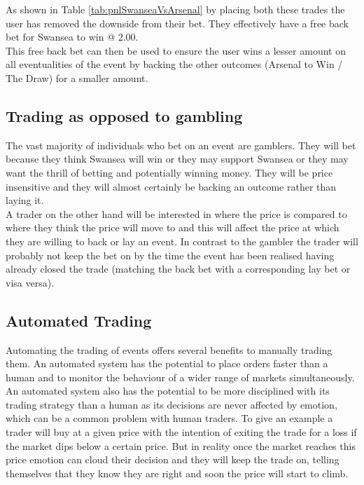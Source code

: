 			As shown in Table \ref{tab:pnlSwanseaVsArsenal} by placing both these trades the user has removed the downside from their bet. They effectively have a free back bet for Swansea to win @ 2.00. \\
			
			This free back bet can then be used to ensure the user wins a lesser amount on all eventualities of the event by backing the other outcomes (Arsenal to Win / The Draw) for a smaller amount.
			
		\subsection{Trading as opposed to gambling}
			
			The vast majority of individuals who bet on an event are gamblers. They will bet because they think Swansea will win or they may support Swansea or they may want the thrill of betting and potentially winning money. They will be price insensitive and they will almost certainly be backing an outcome rather than laying it.\\
			
			 A trader on the other hand will be interested in where the price is compared to where they think the price will move to and this will affect the price at which they are willing to back or lay an event. In contrast to the gambler the trader will probably not keep the bet on by the time the event has been realised having already closed the trade (matching the back bet with a corresponding lay bet or visa versa).
		
		\subsection{Automated Trading}
		
			Automating the trading of events offers several benefits to manually trading them. An automated system has the potential to place orders faster than a human and to monitor the behaviour of a wider range of markets simultaneously.\\
			
			An automated system also has the potential to be more disciplined with its trading strategy than a human as its decisions are never affected by emotion, which can be a common problem with human traders. To give an example a trader will buy at a given price with the intention of exiting the trade for a loss if the market dips below a certain price. But in reality once the market reaches this price emotion can cloud their decision and they will keep the trade on, telling themselves that they know they are right and soon the price will start to climb.